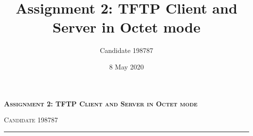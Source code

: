 \documentclass[12pt, a4paper]{article}
\title{Assignment 2: TFTP Client and Server in Octet mode}
\author{Candidate 198787}
\date{8 May 2020}
\begin{document}
\maketitle
\setcounter{secnumdepth}{0}

\begin{center}
    {\scshape\Large\bfseries Assignment 2: TFTP Client and Server in Octet mode \unskip\strut\par}
    \vspace{0.2cm}
    {\scshape\small Candidate 198787 \unskip\strut\par}
    \vspace{0.5cm}
    {\vspace{5pt}\hrule\vspace{6pt}}
\end{center}



\pagebreak


\nocite{*}
\end{document}
